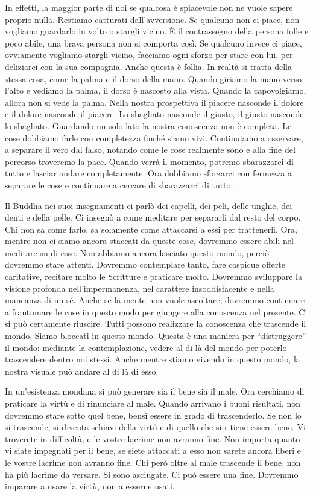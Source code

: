 In effetti, la maggior parte di noi se qualcosa è spiacevole non ne
vuole sapere proprio nulla. Restiamo catturati dall'avversione. Se
qualcuno non ci piace, non vogliamo guardarlo in volto o stargli vicino.
È il contrassegno della persona folle e poco abile, una brava persona
non si comporta così. Se qualcuno invece ci piace, ovviamente vogliamo
stargli vicino, facciamo ogni sforzo per stare con lui, per deliziarci
con la sua compagnia. Anche questa è follia. In realtà si tratta della
stessa cosa, come la palma e il dorso della mano. Quando giriamo la mano
verso l'alto e vediamo la palma, il dorso è nascosto alla vista. Quando
la capovolgiamo, allora non si vede la palma. Nella nostra prospettiva
il piacere nasconde il dolore e il dolore nasconde il piacere. Lo
sbagliato nasconde il giusto, il giusto nasconde lo sbagliato. Guardando
un solo lato la nostra conoscenza non è completa. Le cose dobbiamo farle
con completezza finché siamo vivi. Continuiamo a osservare, a separare
il vero dal falso, notando come le cose realmente sono e alla fine del
percorso troveremo la pace. Quando verrà il momento, potremo sbarazzarci
di tutto e lasciar andare completamente. Ora dobbiamo sforzarci con
fermezza a separare le cose e continuare a cercare di sbarazzarci di
tutto.

\enlargethispage{-\baselineskip}

Il Buddha nei suoi insegnamenti ci parlò dei capelli, dei peli, delle
unghie, dei denti e della pelle. Ci insegnò a come meditare per
separarli dal resto del corpo. Chi non sa come farlo, sa solamente come
attaccarsi a essi per trattenerli. Ora, mentre non ci siamo ancora
staccati da queste cose, dovremmo essere abili nel meditare su di esse.
Non abbiamo ancora lasciato questo mondo, perciò dovremmo stare attenti.
Dovremmo contemplare tanto, fare cospicue offerte caritative, recitare
molto le Scritture e praticare molto. Dovremmo sviluppare la visione
profonda nell'impermanenza, nel carattere insoddisfacente e nella
mancanza di un sé. Anche se la mente non vuole ascoltare, dovremmo
continuare a frantumare le cose in questo modo per giungere alla
conoscenza nel presente. Ci si può certamente riuscire. Tutti possono
realizzare la conoscenza che trascende il mondo. Siamo bloccati in
questo mondo. Questa è una maniera per ``distruggere'' il mondo:
mediante la contemplazione, vedere al di là del mondo per poterlo
trascendere dentro noi stessi. Anche mentre stiamo vivendo in questo
mondo, la nostra visuale può andare al di là di esso.

In un'esistenza mondana si può generare sia il bene sia il male. Ora
cerchiamo di praticare la virtù e di rinunciare al male. Quando arrivano
i buoni risultati, non dovremmo stare sotto quel bene, bensì essere in
grado di trascenderlo. Se non lo si trascende, si diventa schiavi della
virtù e di quello che si ritiene essere bene. Vi troverete in
difficoltà, e le vostre lacrime non avranno fine. Non importa quanto vi
siate impegnati per il bene, se siete attaccati a esso non sarete ancora
liberi e le vostre lacrime non avranno fine. Chi però oltre al male
trascende il bene, non ha più lacrime da versare. Si sono asciugate. Ci
può essere una fine. Dovremmo imparare a usare la virtù, non a esserne
usati.

